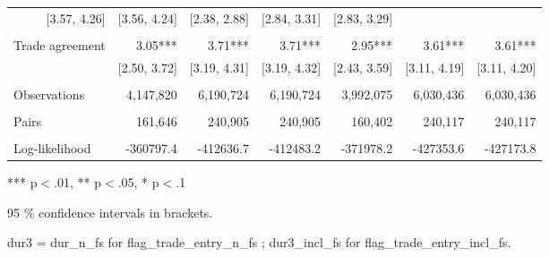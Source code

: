 \begin{table}[!h]
\begin{tabular}{lllllll}
  \multicolumn{1}{r}{[3.57,    4.26]} &
  \multicolumn{1}{r}{[3.56,    4.24]} &
  \multicolumn{1}{r}{[2.38,    2.88]} &
  \multicolumn{1}{r}{[2.84,    3.31]} &
  \multicolumn{1}{r}{[2.83,    3.29]} \\
\multicolumn{1}{l}{} &
  \multicolumn{1}{|r}{} &
  \multicolumn{1}{r}{} &
  \multicolumn{1}{r}{} &
  \multicolumn{1}{r}{} &
  \multicolumn{1}{r}{} &
  \multicolumn{1}{r}{} \\
\multicolumn{1}{l}{Trade agreement} &
  \multicolumn{1}{|r}{3.05***} &
  \multicolumn{1}{r}{3.71***} &
  \multicolumn{1}{r}{3.71***} &
  \multicolumn{1}{r}{2.95***} &
  \multicolumn{1}{r}{3.61***} &
  \multicolumn{1}{r}{3.61***} \\
\multicolumn{1}{l}{} &
  \multicolumn{1}{|r}{[2.50,    3.72]} &
  \multicolumn{1}{r}{[3.19,    4.31]} &
  \multicolumn{1}{r}{[3.19,    4.32]} &
  \multicolumn{1}{r}{[2.43,    3.59]} &
  \multicolumn{1}{r}{[3.11,    4.19]} &
  \multicolumn{1}{r}{[3.11,    4.20]} \\
\multicolumn{1}{l}{} &
  \multicolumn{1}{|r}{} &
  \multicolumn{1}{r}{} &
  \multicolumn{1}{r}{} &
  \multicolumn{1}{r}{} &
  \multicolumn{1}{r}{} &
  \multicolumn{1}{r}{} \\
\multicolumn{1}{l}{Observations} &
  \multicolumn{1}{|r}{4,147,820} &
  \multicolumn{1}{r}{6,190,724} &
  \multicolumn{1}{r}{6,190,724} &
  \multicolumn{1}{r}{3,992,075} &
  \multicolumn{1}{r}{6,030,436} &
  \multicolumn{1}{r}{6,030,436} \\
\multicolumn{1}{l}{} &
  \multicolumn{1}{|r}{} &
  \multicolumn{1}{r}{} &
  \multicolumn{1}{r}{} &
  \multicolumn{1}{r}{} &
  \multicolumn{1}{r}{} &
  \multicolumn{1}{r}{} \\
\multicolumn{1}{l}{Pairs} &
  \multicolumn{1}{|r}{161,646} &
  \multicolumn{1}{r}{240,905} &
  \multicolumn{1}{r}{240,905} &
  \multicolumn{1}{r}{160,402} &
  \multicolumn{1}{r}{240,117} &
  \multicolumn{1}{r}{240,117} \\
\multicolumn{1}{l}{} &
  \multicolumn{1}{|r}{} &
  \multicolumn{1}{r}{} &
  \multicolumn{1}{r}{} &
  \multicolumn{1}{r}{} &
  \multicolumn{1}{r}{} &
  \multicolumn{1}{r}{} \\
\multicolumn{1}{l}{Log-likelihood} &
  \multicolumn{1}{|r}{-360797.4} &
  \multicolumn{1}{r}{-412636.7} &
  \multicolumn{1}{r}{-412483.2} &
  \multicolumn{1}{r}{-371978.2} &
  \multicolumn{1}{r}{-427353.6} &
  \multicolumn{1}{r}{-427173.8} \\
\cline{1-7}
\end{tabular}

\footnotesize{
*** p$<$.01, ** p$<$.05, * p$<$.1

95 \% confidence intervals in brackets.

dur3 = dur\_n\_fs for flag\_trade\_entry\_n\_fs ; dur3\_incl\_fs for flag\_trade\_entry\_incl\_fs.
}
\end{table}

